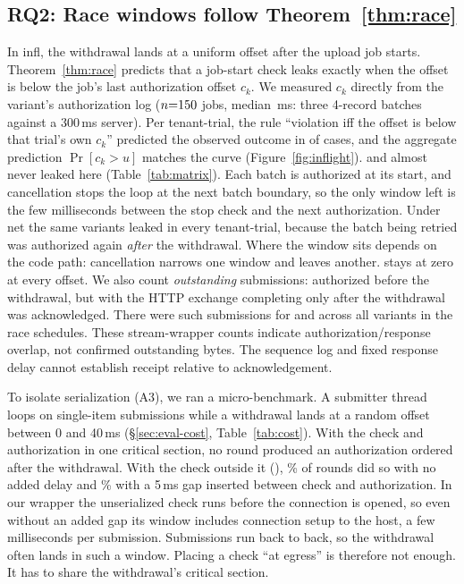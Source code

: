 

\subsection{RQ2: Race windows follow Theorem~\ref{thm:race}}
\label{sec:eval-race}




In \textsf{infl}, the withdrawal lands at a uniform offset after the upload job starts. Theorem~\ref{thm:race} predicts that a
job-start check leaks exactly when the offset is below the job's last authorization offset $c_k$. We measured $c_k$ directly from the
 variant's authorization log ($n{=}150{}$ jobs, median \cmaxMedianMs{}\,ms: three 4-record batches against a
300\,ms server). Per tenant-trial, the rule ``violation iff the offset is below that trial's own $c_k$'' predicted the observed outcome in
\predAgree{} of \predN{} cases, and the aggregate prediction $\Pr[c_k>u]$ matches the curve (Figure~\ref{fig:inflight}).
 and  almost never leaked here (Table~\ref{tab:matrix}). Each batch is authorized at its start, and
cancellation stops the loop at the next batch boundary, so the only window left is the few milliseconds between the stop
check and the next authorization. Under \textsf{net} the same variants leaked in every tenant-trial, because the batch being
retried was authorized again \emph{after} the withdrawal. Where the window sits depends on the code path: cancellation
narrows one window and leaves another. \sys
stays at zero at every offset. We also count \emph{outstanding} submissions: authorized before the withdrawal, but with the HTTP exchange completing only
after the withdrawal was acknowledged. There were \outstandingRd{} such submissions for \sys and \outstandingSubs{} across all
variants in the race schedules. These stream-wrapper counts indicate authorization/response overlap, not confirmed outstanding bytes.
The sequence log and fixed response delay cannot establish receipt relative to acknowledgement.

To isolate serialization (A3), we ran a micro-benchmark. A submitter thread loops on single-item submissions while a
withdrawal lands at a random offset between 0 and 40\,ms (\S\ref{sec:eval-cost}, Table~\ref{tab:cost}). With the check and authorization in one
critical section, no round produced an authorization ordered after the withdrawal. With the check outside it (),
\noserZeroPct{}\% of rounds did so with no added delay and \noserFivePct{}\% with a 5\,ms gap inserted between check and authorization.
In our wrapper the unserialized check runs before the connection is opened, so even without an added gap its window includes
connection setup to the host, a few milliseconds per submission. Submissions run back to back, so the withdrawal often lands
in such a window. Placing a check ``at egress'' is therefore not enough. It has to share the withdrawal's critical section.

